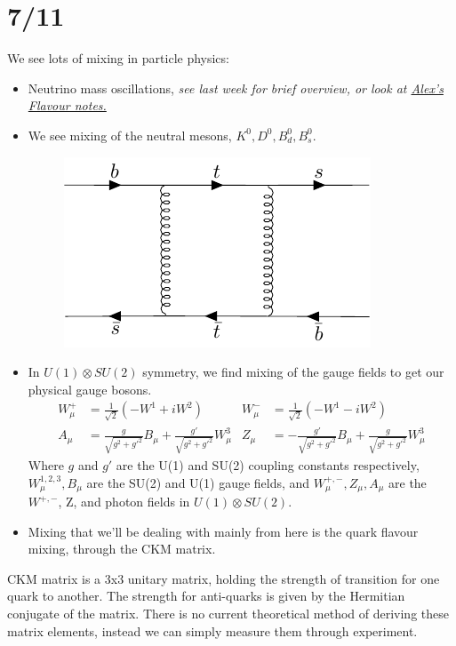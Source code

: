 \documentclass[a4paper, 11pt, normalem]{article}
\begin{document}
\section*{7/11}
We see lots of mixing in particle physics:
\begin{itemize}
    \item Neutrino mass oscillations, \textit{see last week for brief overview, or look at \href{https://www.ippp.dur.ac.uk/~lenz/Lecture_Flavour_2017.pdf}{Alex's Flavour notes.}}
    \item We see mixing of the neutral mesons, $K^0,D^0,B_d^0,B_s^0$.
        \begin{figure}[H]
            \centering
            \includegraphics[scale=0.75]{bts.pdf}
        \end{figure}
    \item In $U(1)\otimes SU(2)$ symmetry, we find mixing of the gauge fields to get our physical gauge bosons.
        \begin{align}
            W^+_\mu &= \frac{1}{\sqrt{2}}(-W^1 + iW^2) & W^-_\mu &= \frac{1}{\sqrt{2}}(-W^1-iW^2) \\
            A_\mu &= \frac{g}{\sqrt{g^2+g'^2}}B_\mu + \frac{g'}{\sqrt{g^2+g'^2}}W^3_\mu & Z_\mu &= -\frac{g'}{\sqrt{g^2+g'^2}}B_\mu + \frac{g}{\sqrt{g^2+g'^2}}W^3_\mu
        \end{align}
        Where $g$ and $g'$ are the U(1) and SU(2) coupling constants respectively, $W^{1,2,3}_\mu,B_\mu$ are the SU(2) and U(1) gauge fields, and $W^{+,-}_\mu,Z_\mu,A_\mu$ are the $W^{+,-}$, Z, and photon fields in $U(1)\otimes SU(2)$.
    \item Mixing that we'll be dealing with mainly from here is the quark flavour mixing, through the CKM matrix. 
\end{itemize}
CKM matrix is a 3x3 unitary matrix, holding the strength of transition for one quark to another. 
The strength for anti-quarks is given by the Hermitian conjugate of the matrix. 
There is no current theoretical method of deriving these matrix elements, instead we can simply measure them through experiment. 
\end{document}
